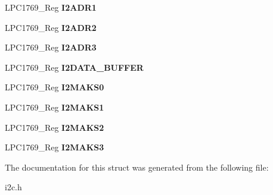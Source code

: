\begin{DoxyCompactItemize}
\item 
\hypertarget{struct_l_p_c1769___i2_c_a5914249049ea4cdc414dd36f933cbcaf}{L\+P\+C1769\+\_\+\+Reg {\bfseries I2\+A\+D\+R1}}\label{struct_l_p_c1769___i2_c_a5914249049ea4cdc414dd36f933cbcaf}

\item 
\hypertarget{struct_l_p_c1769___i2_c_a0bee1daf745a6bacbde8d25c48bfd5db}{L\+P\+C1769\+\_\+\+Reg {\bfseries I2\+A\+D\+R2}}\label{struct_l_p_c1769___i2_c_a0bee1daf745a6bacbde8d25c48bfd5db}

\item 
\hypertarget{struct_l_p_c1769___i2_c_a4e0ae880d972b303fe06a3538f83a4b6}{L\+P\+C1769\+\_\+\+Reg {\bfseries I2\+A\+D\+R3}}\label{struct_l_p_c1769___i2_c_a4e0ae880d972b303fe06a3538f83a4b6}

\item 
\hypertarget{struct_l_p_c1769___i2_c_a72e821346cd7941a1ff7f6c269a5ea02}{L\+P\+C1769\+\_\+\+Reg {\bfseries I2\+D\+A\+T\+A\+\_\+\+B\+U\+F\+F\+E\+R}}\label{struct_l_p_c1769___i2_c_a72e821346cd7941a1ff7f6c269a5ea02}

\item 
\hypertarget{struct_l_p_c1769___i2_c_adb07be9380cd2bd4b51036781c5a50ce}{L\+P\+C1769\+\_\+\+Reg {\bfseries I2\+M\+A\+K\+S0}}\label{struct_l_p_c1769___i2_c_adb07be9380cd2bd4b51036781c5a50ce}

\item 
\hypertarget{struct_l_p_c1769___i2_c_a704cad41251f9f695fbbcb7bbe4675c5}{L\+P\+C1769\+\_\+\+Reg {\bfseries I2\+M\+A\+K\+S1}}\label{struct_l_p_c1769___i2_c_a704cad41251f9f695fbbcb7bbe4675c5}

\item 
\hypertarget{struct_l_p_c1769___i2_c_ac0e9dfa2d3da2f4ef8cb84a9121bf220}{L\+P\+C1769\+\_\+\+Reg {\bfseries I2\+M\+A\+K\+S2}}\label{struct_l_p_c1769___i2_c_ac0e9dfa2d3da2f4ef8cb84a9121bf220}

\item 
\hypertarget{struct_l_p_c1769___i2_c_a24b66fb7a6365af27bd09331afa7ac56}{L\+P\+C1769\+\_\+\+Reg {\bfseries I2\+M\+A\+K\+S3}}\label{struct_l_p_c1769___i2_c_a24b66fb7a6365af27bd09331afa7ac56}

\end{DoxyCompactItemize}


The documentation for this struct was generated from the following file\+:\begin{DoxyCompactItemize}
\item 
i2c.\+h\end{DoxyCompactItemize}
